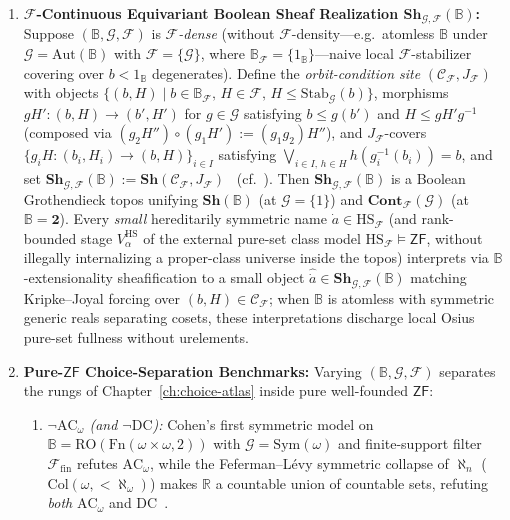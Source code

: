 \begin{theorem}
\begin{enumerate}
  \item \textbf{$\mathcal{F}$-Continuous Equivariant Boolean Sheaf Realization $\mathbf{Sh}_{\mathcal{G}, \mathcal{F}}(\mathbb{B})$:} Suppose $(\mathbb{B}, \mathcal{G}, \mathcal{F})$ is \emph{$\mathcal{F}$-dense} (without $\mathcal{F}$-density---e.g.\ atomless $\mathbb{B}$ under $\mathcal{G} = \mathrm{Aut}(\mathbb{B})$ with $\mathcal{F} = \{\mathcal{G}\}$, where $\mathbb{B}_{\mathcal{F}} = \{1_{\mathbb{B}}\}$---naive local $\mathcal{F}$-stabilizer covering over $b < 1_{\mathbb{B}}$ degenerates). Define the \emph{orbit-condition site} $(\mathcal{C}_{\mathcal{F}}, J_{\mathcal{F}})$ with objects $\{(b, H) \mid b \in \mathbb{B}_{\mathcal{F}},\, H \in \mathcal{F},\, H \le \mathrm{Stab}_{\mathcal{G}}(b)\}$, morphisms $g H' : (b, H) \to (b', H')$ for $g \in \mathcal{G}$ satisfying $b \le g(b')$ and $H \le g H' g^{-1}$ (composed via $(g_2 H'') \circ (g_1 H') := (g_1 g_2) H''$), and $J_{\mathcal{F}}$-covers $\{g_i H : (b_i, H_i) \to (b, H)\}_{i \in I}$ satisfying $\bigvee_{i \in I,\, h \in H} h(g_i^{-1}(b_i)) = b$, and set $\mathbf{Sh}_{\mathcal{G}, \mathcal{F}}(\mathbb{B}) := \mathbf{Sh}(\mathcal{C}_{\mathcal{F}}, J_{\mathcal{F}})$~\cite{Fourman80} (cf.~\cite[\S D4.5]{Johnstone02}). Then $\mathbf{Sh}_{\mathcal{G}, \mathcal{F}}(\mathbb{B})$ is a Boolean Grothendieck topos unifying $\mathbf{Sh}(\mathbb{B})$ (at $\mathcal{G} = \{1\}$) and $\mathbf{Cont}_{\mathcal{F}}(\mathcal{G})$ (at $\mathbb{B} = \mathbf{2}$). Every \emph{small} hereditarily symmetric name $\dot{a} \in \mathrm{HS}_{\mathcal{F}}$ (and rank-bounded stage $V^{\mathrm{HS}}_\alpha$ of the external pure-set class model $\mathrm{HS}_{\mathcal{F}} \models \mathsf{ZF}$, without illegally internalizing a proper-class universe inside the topos) interprets via $\mathbb{B}$-extensionality sheafification to a small object $\widehat{\dot{a}} \in \mathbf{Sh}_{\mathcal{G}, \mathcal{F}}(\mathbb{B})$ matching Kripke--Joyal forcing over $(b, H) \in \mathcal{C}_{\mathcal{F}}$; when $\mathbb{B}$ is atomless with symmetric generic reals separating cosets, these interpretations discharge local Osius pure-set fullness without urelements.
  \item \textbf{Pure-$\mathsf{ZF}$ Choice-Separation Benchmarks:} Varying $(\mathbb{B}, \mathcal{G}, \mathcal{F})$ separates the rungs of Chapter~\ref{ch:choice-atlas} inside pure well-founded $\mathsf{ZF}$:
  \begin{enumerate}
    \item \emph{$\neg\mathrm{AC}_\omega$ (and $\neg\mathrm{DC}$):} Cohen's first symmetric model on $\mathbb{B} = \mathrm{RO}(\mathrm{Fn}(\omega \times \omega, 2))$ with $\mathcal{G} = \mathrm{Sym}(\omega)$ and finite-support filter $\mathcal{F}_{\mathrm{fin}}$ refutes $\mathrm{AC}_\omega$, while the Feferman--L\'evy symmetric collapse of $\aleph_n$ ($\mathrm{Col}(\omega, <\!\aleph_\omega)$) makes $\mathbb{R}$ a countable union of countable sets, refuting \emph{both} $\mathrm{AC}_\omega$ and $\mathrm{DC}$~\cite[Chs.~5, 10]{Jech73}.

\end{enumerate}
\end{enumerate}
\end{theorem}
